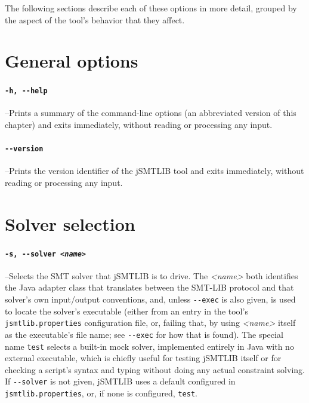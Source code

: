 \documentclass[12pt,oneside]{report}
\begin{document}
\bigskip
The following sections describe each of these options in more detail, grouped by the aspect of the tool's behavior that they affect.

\section{General options}

\paragraph{\tt -h, -{}-help}\label{opt:help} --Prints a summary of the command-line options (an abbreviated version of this chapter) and exits immediately, without reading or processing any input.

\paragraph{\tt -{}-version}\label{opt:version} --Prints the version identifier of the jSMTLIB tool and exits immediately, without reading or processing any input.

\section{Solver selection}

\paragraph{\tt -s, -{}-solver \it <name>}\label{opt:solver} --Selects the SMT solver that jSMTLIB is to drive. The {\it <name>} both identifies the Java adapter class that translates between the SMT-LIB protocol and that solver's own input/output conventions, and, unless {\tt -{}-exec} is also given, is used to locate the solver's executable (either from an entry in the tool's {\tt jsmtlib.properties} configuration file, or, failing that, by using {\it <name>} itself as the executable's file name; see {\tt -{}-exec} for how that is found). The special name {\tt test} selects a built-in mock solver, implemented entirely in Java with no external executable, which is chiefly useful for testing jSMTLIB itself or for checking a script's syntax and typing without doing any actual constraint solving. If {\tt -{}-solver} is not given, jSMTLIB uses a default configured in {\tt jsmtlib.properties}, or, if none is configured, {\tt test}.
\end{document}
